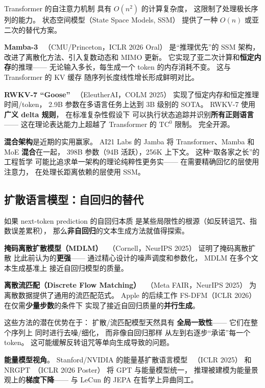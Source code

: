 Transformer 的自注意力机制
具有 $O(n^2)$ 的计算复杂度，
这限制了处理极长序列的能力。
状态空间模型（State Space Models, SSM）
提供了一种 $O(n)$ 或亚二次的替代方案。

\textbf{Mamba-3}~\cite{lahoti2026mamba3}
（CMU/Princeton，ICLR 2026 Oral）
是``推理优先''的 SSM 架构，
改进了离散化方法、引入复数动态和 MIMO 更新。
它实现了亚二次计算和\textbf{恒定内存}的推理——
无论输入多长，每生成一个 token 的内存消耗不变。
这与 Transformer 的 KV 缓存
随序列长度线性增长形成鲜明对比。

\textbf{RWKV-7 ``Goose''}~\cite{peng2025rwkv7}
（EleutherAI，COLM 2025）
实现了恒定内存和恒定推理时间/token，
2.9B 参数在多语言任务上达到 3B 级别的 SOTA。
RWKV-7 使用\textbf{广义 delta 规则}，
在标准复杂性假设下
可以执行状态追踪并识别\textbf{所有正则语言}——
这在理论表达能力上超越了
Transformer 的 $\text{TC}^0$ 限制。
完全开源。

\textbf{混合架构}是近期的实用赢家。
AI21 Labs 的 Jamba
将 Transformer、Mamba 和 MoE \textbf{混合}在一起，
398B 参数（94B 活跃），256K 上下文。
这种``取各家之长''的工程哲学
可能比追求单一架构的理论纯粹性更务实——
在需要精确回忆的层使用注意力，
在处理长距离依赖的层使用 SSM。


\subsection{扩散语言模型：自回归的替代}

如果 next-token prediction 的自回归本质
是某些局限性的根源（如反转诅咒、指数误差累积），
那么\textbf{非自回归}的文本生成方法就值得探索。

\textbf{掩码离散扩散模型（MDLM）}~\cite{sahoo2025mdlm}
（Cornell，NeurIPS 2025）
证明了掩码离散扩散
比此前认为的\textbf{更强}——
通过精心设计的噪声调度和参数化，
MDLM 在多个文本生成基准上
接近自回归模型的质量。

\textbf{离散流匹配（Discrete Flow Matching）}~\cite{gat2025dfm}
（Meta FAIR，NeurIPS 2025）
为离散数据提供了通用的流匹配范式。
Apple 的后续工作 FS-DFM（ICLR 2026）
在仅需\textbf{少量步数}的条件下
实现了接近自回归质量的\textbf{并行生成}。

这些方法的潜在优势在于：
扩散/流匹配模型天然具有
\textbf{全局一致性}——
它们在整个序列上
同时进行去噪/细化，
而非像自回归那样
从左到右逐步``承诺''每一个 token。
这可能缓解反转诅咒等单向生成导致的问题。

\textbf{能量模型视角}。
Stanford/NVIDIA 的能量基扩散语言模型~\cite{xu2025energydiffusion}
（ICLR 2025）
和 NRGPT~\cite{dehmamy2026nrgpt}（ICLR 2026 Poster）
将 GPT 与能量模型统一，
推理被建模为能量景观上的\textbf{梯度下降}——
与 LeCun 的 JEPA 在哲学上异曲同工。


